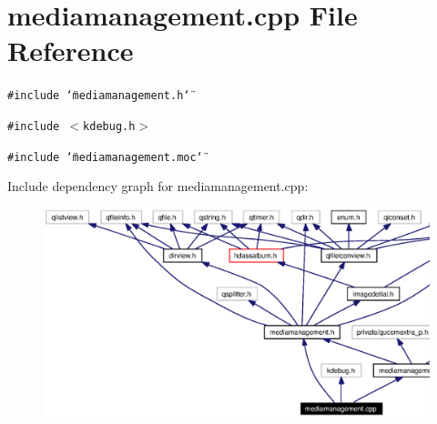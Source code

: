 \section{mediamanagement.cpp File Reference}
\label{mediamanagement_8cpp}


{\tt \#include \char`\"{}mediamanagement.h\char`\"{}}\par
{\tt \#include $<$kdebug.h$>$}\par
{\tt \#include \char`\"{}mediamanagement.moc\char`\"{}}\par


Include dependency graph for mediamanagement.cpp:\begin{figure}[H]
\begin{center}
\leavevmode
\includegraphics[width=398pt]{mediamanagement_8cpp__incl}
\end{center}
\end{figure}
